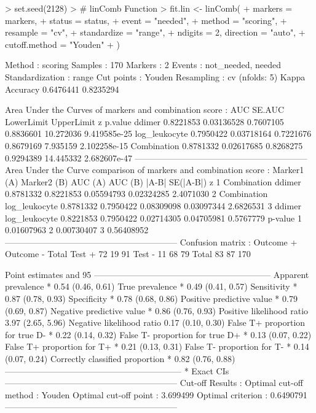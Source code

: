 \documentclass[10pt]{article}
\begin{document}
\begin{Schunk}
\begin{Sinput}
> set.seed(2128)
> # linComb Function
> fit.lin <- linComb(
+   markers = markers,
+   status = status,
+   event = "needed",
+   method = "scoring",
+   resample = "cv",
+   standardize = "range",
+   ndigits = 2, direction = "auto",
+   cutoff.method = "Youden"
+ )
\end{Sinput}
\begin{Soutput}
Method : scoring 
Samples : 170 
Markers : 2 
Events : not_needed, needed 
Standardization : range 
Cut points : Youden 
Resampling : cv (nfolds: 5)
 Kappa       Accuracy  
 0.6476441   0.8235294

Area Under the Curves of markers and combination score :  
                    AUC     SE.AUC LowerLimit UpperLimit         z      p.value
ddimer        0.8221853 0.03136528  0.7607105  0.8836601 10.272036 9.419585e-25
log_leukocyte 0.7950422 0.03718164  0.7221676  0.8679169  7.935159 2.102258e-15
Combination   0.8781332 0.02617685  0.8268275  0.9294389 14.445332 2.682607e-47
------------------------------------------------------------ 
Area Under the Curve comparison of markers and combination score :  
  Marker1 (A)   Marker2 (B)   AUC (A)   AUC (B)      |A-B|  SE(|A-B|)         z
1 Combination        ddimer 0.8781332 0.8221853 0.05594793 0.02324285 2.4071030
2 Combination log_leukocyte 0.8781332 0.7950422 0.08309098 0.03097344 2.6826531
3      ddimer log_leukocyte 0.8221853 0.7950422 0.02714305 0.04705981 0.5767779
     p-value
1 0.01607963
2 0.00730407
3 0.56408952
------------------------------------------------------------ 
Confusion matrix :  
          Outcome +    Outcome -      Total
Test +           72           19         91
Test -           11           68         79
Total            83           87        170

Point estimates and 95% CIs:
--------------------------------------------------------------
Apparent prevalence *                  0.54 (0.46, 0.61)
True prevalence *                      0.49 (0.41, 0.57)
Sensitivity *                          0.87 (0.78, 0.93)
Specificity *                          0.78 (0.68, 0.86)
Positive predictive value *            0.79 (0.69, 0.87)
Negative predictive value *            0.86 (0.76, 0.93)
Positive likelihood ratio              3.97 (2.65, 5.96)
Negative likelihood ratio              0.17 (0.10, 0.30)
False T+ proportion for true D- *      0.22 (0.14, 0.32)
False T- proportion for true D+ *      0.13 (0.07, 0.22)
False T+ proportion for T+ *           0.21 (0.13, 0.31)
False T- proportion for T- *           0.14 (0.07, 0.24)
Correctly classified proportion *      0.82 (0.76, 0.88)
--------------------------------------------------------------
* Exact CIs
------------------------------------------------------------ 
Cut-off Results : 
Optimal cut-off method : Youden 
Optimal cut-off point  : 3.699499 
Optimal criterion      : 0.6490791 
------------------------------------------------------------ 
\end{Soutput}
\end{Schunk}
\end{document}
